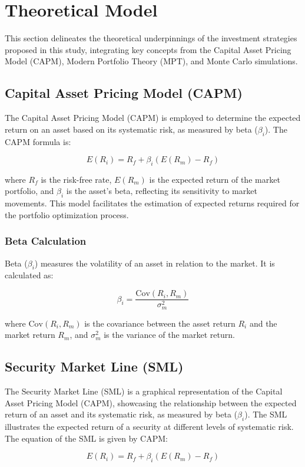 \section{Theoretical Model}
This section delineates the theoretical underpinnings of the investment strategies proposed in this study, integrating key concepts from the Capital Asset Pricing Model (CAPM), Modern Portfolio Theory (MPT), and Monte Carlo simulations.

\subsection{Capital Asset Pricing Model (CAPM)}
The Capital Asset Pricing Model (CAPM) is employed to determine the expected return on an asset based on its systematic risk, as measured by beta ($\beta_i$). The CAPM formula is:

\[
E(R_i) = R_f + \beta_i (E(R_m) - R_f)
\]

where \( R_f \) is the risk-free rate, \( E(R_m) \) is the expected return of the market portfolio, and \( \beta_i \) is the asset’s beta, reflecting its sensitivity to market movements. This model facilitates the estimation of expected returns required for the portfolio optimization process.

\subsubsection{Beta Calculation}
Beta ($\beta_i$) measures the volatility of an asset in relation to the market. It is calculated as:

\[
\beta_i = \frac{\text{Cov}(R_i, R_m)}{\sigma^2_m}
\]

where \(\text{Cov}(R_i, R_m)\) is the covariance between the asset return \( R_i \) and the market return \( R_m \), and \( \sigma^2_m \) is the variance of the market return.

\subsection{Security Market Line (SML)}
The Security Market Line (SML) is a graphical representation of the Capital Asset Pricing Model (CAPM), showcasing the relationship between the expected return of an asset and its systematic risk, as measured by beta ($\beta_i$). The SML illustrates the expected return of a security at different levels of systematic risk. The equation of the SML is given by CAPM:

\[
E(R_i) = R_f + \beta_i (E(R_m) - R_f)
\]

